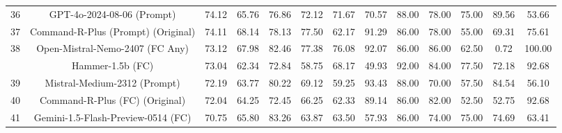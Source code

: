 \documentclass{article}
\begin{document}
\begin{table}[h]
{\begin{tabular}{ccccccccccccc}
36                     & GPT-4o-2024-08-06 (Prompt)                     & 74.12                         & 65.76  & 76.86    & 72.12    & 71.67                                                       & 70.57  & 88.00    & 78.00    & 75.00                                                       & 89.56                         & 53.66                       \\
37                     & Command-R-Plus (Prompt) (Original)             & 74.11                         & 68.14  & 78.13    & 77.50    & 62.17                                                       & 91.29  & 86.00    & 78.00    & 55.00                                                       & 69.31                         & 75.61                       \\
38                     & Open-Mistral-Nemo-2407 (FC Any)                & 73.12                         & 67.98  & 82.46    & 77.38    & 76.08                                                       & 92.07  & 86.00    & 86.00    & 62.50                                                       & 0.72                          & 100.00                      \\
\rowcolor[HTML]{EFEFEF} 
                       & Hammer-1.5b (FC)                               & 73.04                         & 62.34  & 72.84    & 58.75    & 68.17                                                       & 49.93  & 92.00    & 84.00    & 77.50                                                       & 72.18                         & 92.68                       \\
39                     & Mistral-Medium-2312 (Prompt)                   & 72.19                         & 63.77  & 80.22    & 69.12    & 59.25                                                       & 93.43  & 88.00    & 70.00    & 57.50                                                       & 84.54                         & 56.10                       \\
40                     & Command-R-Plus (FC) (Original)                 & 72.04                         & 64.25  & 72.45    & 66.25    & 62.33                                                       & 89.14  & 86.00    & 82.00    & 52.50                                                       & 52.75                         & 92.68                       \\
41                     & Gemini-1.5-Flash-Preview-0514 (FC)             & 70.75                         & 65.80  & 83.26    & 63.87    & 63.50                                                       & 57.93  & 86.00    & 74.00    & 75.00                                                       & 74.69                         & 63.41                       \\

\end{tabular}}
\end{table}
\end{document}
